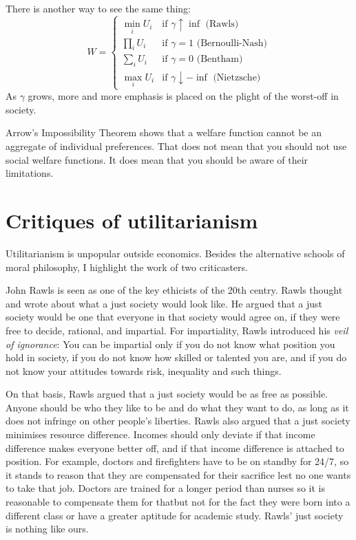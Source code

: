 There is another way to see the same thing:
\begin{equation}
\label{eq:Atkinson}
    W = \begin{cases}
    \min_i U_i & \text{if } \gamma \uparrow \inf \text{ (Rawls)}\\
    \prod_i U_i & \text{if } \gamma=1 \text{ (Bernoulli-Nash)}\\
    \sum_i U_i & \text{if } \gamma=0 \text{ (Bentham)}\\
    \max_i U_i & \text{if } \gamma \downarrow -\inf \text{ (Nietzsche)}
\end{cases}
\end{equation}
As $\gamma$ grows, more and more emphasis is placed on the plight of the worst-off in society.

Arrow's Impossibility Theorem shows that a welfare function cannot be an aggregate of individual preferences. That does not mean that you should not use social welfare functions. It does mean that you should be aware of their limitations.

\section{Critiques of utilitarianism}
Utilitarianism is unpopular outside economics. Besides the alternative schools of moral philosophy, I highlight the work of two criticasters.

John Rawls is seen as one of the key ethicists of the 20th centry. Rawls thought and wrote about what a just society would look like. He argued that a just society would be one that everyone in that society would agree on, if they were free to decide, rational, and impartial. For impartiality, Rawls introduced his \emph{veil of ignorance}: You can be impartial only if you do not know what position you hold in society, if you do not know how skilled or talented you are, and if you do not know your attitudes towards risk, inequality and such things.

On that basis, Rawls argued that a just society would be as free as possible. Anyone should be who they like to be and do what they want to do, as long as it does not infringe on other people's liberties. Rawls also argued that a just society minimises resource difference. Incomes should only deviate if that income difference makes everyone better off, and if that income difference is attached to position. For example, doctors and firefighters have to be on standby for 24/7, so it stands to reason that they are compensated for their sacrifice lest no one wants to take that job. Doctors are trained for a longer period than nurses so it is reasonable to compensate them for that\textemdash but not for the fact they were born into a different class or have a greater aptitude for academic study. Rawls' just society is nothing like ours.

